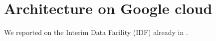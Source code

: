\section{Architecture on Google cloud} \label{sec:google}

We reported on the Interim Data Facility (IDF) already in \cite{DMTN-209}.
